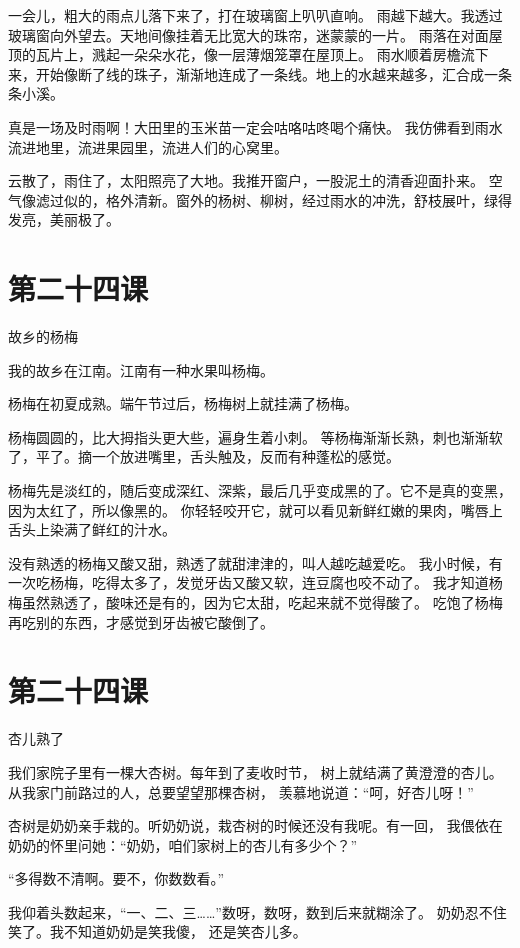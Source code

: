 \documentclass[12pt,UTF8]{ctexbook}
\begin{document}
一会儿，粗大的雨点儿落下来了，打在玻璃窗上叭叭直响。
雨越下越大。我透过玻璃窗向外望去。天地间像挂着无比宽大的珠帘，迷蒙蒙的一片。
雨落在对面屋顶的瓦片上，溅起一朵朵水花，像一层薄烟笼罩在屋顶上。
雨水顺着房檐流下来，开始像断了线的珠子，渐渐地连成了一条线。地上的水越来越多，汇合成一条条小溪。

真是一场及时雨啊！大田里的玉米苗一定会咕咯咕咚喝个痛快。
我仿佛看到雨水流进地里，流进果园里，流进人们的心窝里。

云散了，雨住了，太阳照亮了大地。我推开窗户，一股泥土的清香迎面扑来。
空气像滤过似的，格外清新。窗外的杨树、柳树，经过雨水的冲洗，舒枝展叶，绿得发亮，美丽极了。

\section{第二十四课}

故乡的杨梅

我的故乡在江南。江南有一种水果叫杨梅。

杨梅在初夏成熟。端午节过后，杨梅树上就挂满了杨梅。

杨梅圆圆的，比大拇指头更大些，遍身生着小刺。
等杨梅渐渐长熟，刺也渐渐软了，平了。摘一个放进嘴里，舌头触及，反而有种蓬松的感觉。

杨梅先是淡红的，随后变成深红、深紫，最后几乎变成黑的了。它不是真的变黑，因为太红了，所以像黑的。
你轻轻咬开它，就可以看见新鲜红嫩的果肉，嘴唇上舌头上染满了鲜红的汁水。

没有熟透的杨梅又酸又甜，熟透了就甜津津的，叫人越吃越爱吃。
我小时候，有一次吃杨梅，吃得太多了，发觉牙齿又酸又软，连豆腐也咬不动了。
我才知道杨梅虽然熟透了，酸味还是有的，因为它太甜，吃起来就不觉得酸了。
吃饱了杨梅再吃别的东西，才感觉到牙齿被它酸倒了。

\section{第二十四课}

杏儿熟了

我们家院子里有一棵大杏树。每年到了麦收时节，
树上就结满了黄澄澄的杏儿。从我家门前路过的人，总要望望那棵杏树，
羡慕地说道：“呵，好杏儿呀！”

杏树是奶奶亲手栽的。听奶奶说，栽杏树的时候还没有我呢。有一回，
我偎依在奶奶的怀里问她：“奶奶，咱们家树上的杏儿有多少个？”

“多得数不清啊。要不，你数数看。”

我仰着头数起来，“一、二、三……”数呀，数呀，数到后来就糊涂了。
奶奶忍不住笑了。我不知道奶奶是笑我傻， 还是笑杏儿多。
\end{document}
